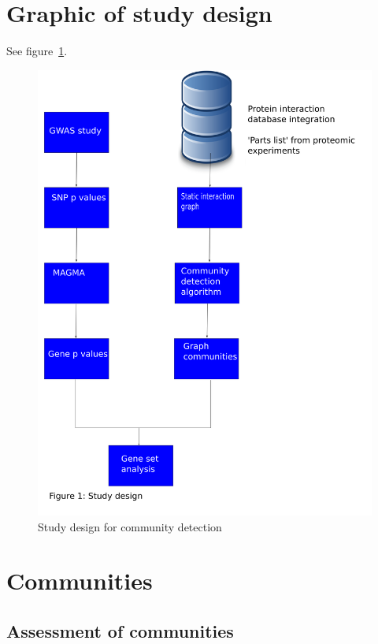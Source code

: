 \section{Graphic of study design}
See figure~\ref{fig:study design community detection}.
\begin{figure}
    \centering
    \includegraphics[width=\textwidth]{images/study_design.png}  
    \caption{Study design for community detection}
    \label{fig:study design community detection}
\end{figure}

\section{Communities}
\label{sec:alternate intro}
\subsection{Assessment of communities}

